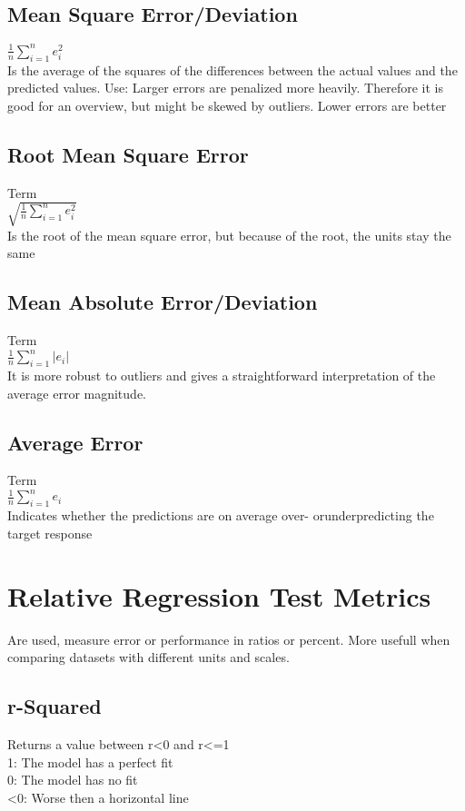 \documentclass{article}
\begin{document}
\subsection{Mean Square Error/Deviation}
$\frac{1}{n} \sum_{i = 1}^{n} e_i^2 $ \\
Is the average of the squares of the differences between the actual values and the predicted values.
Use: Larger errors are penalized more heavily. Therefore it is good for an overview, but might be skewed by outliers. Lower errors are better
\subsection{Root Mean Square Error}
Term\\
$ \sqrt{\frac{1}{n} \sum_{i = 1}^{n} e_i^2 }$  \\
Is the root of the mean square error, but because of the root, the units stay the same
\subsection{Mean Absolute Error/Deviation}
Term\\
$ \frac{1}{n} \sum_{i = 1}^{n} | e_i\vert$ \\
It is more robust to outliers and gives a straightforward interpretation of the average error magnitude.
\subsection{Average Error}
Term\\
$ \frac{1}{n} \sum_{i = 1}^{n} e_i$ \\
Indicates whether the predictions are on average over- orunderpredicting the target response
\section{Relative Regression Test Metrics}
Are used, measure error or performance in ratios or percent. More usefull when comparing datasets with different units and scales. \\ 

\subsection{r-Squared}
Returns a value between r<0 and r<=1\\
1: The model has a perfect fit \\
0: The model has no fit \\
<0: Worse then a horizontal line\\
\end{document}
